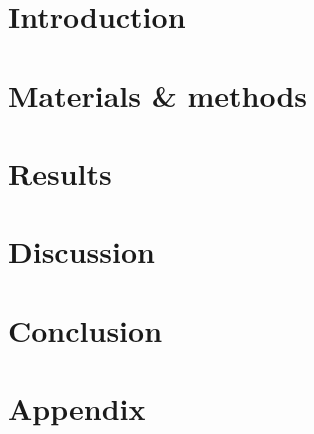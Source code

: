 \documentclass[11pt]{article}
\begin{document}


\newpage
\tableofcontents

\newpage
\section{Introduction}


\section{Materials \& methods}


\section{Results}


\section{Discussion}


\section{Conclusion}


\section{Appendix}


\newpage

\end{document}
